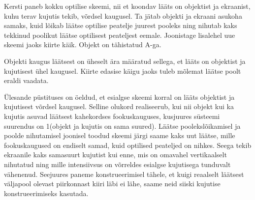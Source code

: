 
Kersti paneb kokku optilise skeemi, nii et koondav lääts on objektist ja ekraanist, kuhu terav kujutis tekib, võrdsel kaugusel. Ta jätab objekti ja ekraani asukoha samaks, kuid lõikab läätse optilise peatelje juurest pooleks ning nihutab kaks tekkinud poolikut läätse optilisest peateljest eemale. Joonistage lisalehel uue skeemi jaoks kiirte käik. Objekt on tähistatud A-ga.
\begin{center}
\end{center}

\hint
Objekti kaugus läätsest on üheselt ära määratud sellega, et lääts on objektist ja kujutisest ühel kaugusel. Kiirte edasise käigu jaoks tuleb mõlemat läätse poolt eraldi vaadata.

\solu
Ülesande püstituses on öeldud, et esialgse skeemi korral on lääts objektist ja kujutisest võrdsel kaugusel. Selline olukord realiseerub, kui nii objekt kui ka kujutis asuvad läätsest kahekordses fookuskauguses, kusjuures süsteemi suurendus on 1(objekt ja kujutis on sama suured). Läätse poolekslõikamisel ja poolde nihutamisel joonisel toodud skeemi järgi saame kaks uut läätse, mille fookuskaugused on endiselt samad, kuid optilised peateljed on nihkes. Seega tekib ekraanile kaks samasuurt kujutist kui enne, mis on omavahel vertikaalselt nihutatud ning mille intensiivsus on võrreldes esialgse kujutisega tunduvalt vähenenud. Seejuures paneme konstrueerimisel tähele, et kuigi reaalselt läätsest väljapool olevast piirkonnast kiiri läbi ei lähe, saame neid siiski kujutise konstrueerimiseks kasutada.

